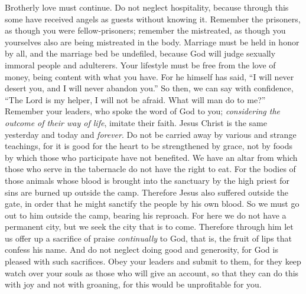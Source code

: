 \begin{biblechapter} %
 Brotherly love must continue.
\verse Do not neglect hospitality, because through this some have received angels as guests without knowing it.
\verse Remember the prisoners, as though you were fellow-prisoners; remember the mistreated, as though you yourselves also are being mistreated in the body.
\verse Marriage must be held in honor by all, and the marriage bed be undefiled, because God will judge sexually immoral people and adulterers.
\verse Your lifestyle must be free from the love of money, being content with what you have. For he himself has said, “I will never desert you, and I will never abandon you.”
\verse So then, we can say with confidence, “The Lord is my helper, I will not be afraid. 
What will man do to me?”
\verse Remember your leaders, who spoke the word of God to you; \textit{considering the outcome of their way of life}, imitate their faith.
\verse Jesus Christ is the same yesterday and today and \textit{forever}.
\verse Do not be carried away by various and strange teachings, for it is good for the heart to be strengthened by grace, not by foods by which those who participate have not benefited.
\verse We have an altar from which those who serve in the tabernacle do not have the right to eat.
\verse For the bodies of those animals whose blood is brought into the sanctuary by the high priest for sins are burned up outside the camp.
\verse Therefore Jesus also suffered outside the gate, in order that he might sanctify the people by his own blood.
\verse So we must go out to him outside the camp, bearing his reproach.
\verse For here we do not have a permanent city, but we seek the city that is to come.
\verse Therefore through him let us offer up a sacrifice of praise \textit{continually} to God, that is, the fruit of lips that confess his name.
\verse And do not neglect doing good and generosity, for God is pleased with such sacrifices.
\verse Obey your leaders and submit to them, for they keep watch over your souls as those who will give an account, so that they can do this with joy and not with groaning, for this would be unprofitable for you.

\end{biblechapter}
